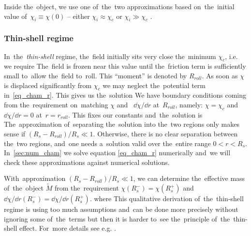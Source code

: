 Inside the~object, we use one of~the~two approximations based on~the~initial value of~$\chi_i\equiv\chi(0)$ -- either $\chi_i\approx\chi_c$ or $\chi_i\gg\chi_c$ .
\subsubsection{Thin-shell regime}
In~the~\textit{thin-shell} regime, the~field initially sits very close the~minimum $\chi_c$, i.e. we require
The~field is frozen near this value until the~friction term is sufficiently small to~allow the~field to~roll. This ``moment'' is denoted by $R_{roll}$. As soon as $\chi$ is displaced significantly from $\chi_c$ we may neglect the~potential term in~\eqref{eq_cham_r}. This gives us the~solution
We have boundary conditions coming from the~requirement on~matching $\chi$ and~ $\dd\chi/\dd r$ at~$R_{roll}$, namely: $\chi=\chi_c$ and~$\dd\chi/\dd r=0$ at~$r=r_{roll}$. This fixes our constants and~the~solution is
The~approximation of~separating the~solution into the~two regions only makes sense if $(R_s-R_{roll})/R_s\ll1$. Otherwise, there is no clear separation between the~two regions, and~one needs a~solution valid over the~entire range $0<r<R_s$. In~\autoref{sec:num_cham} we solve equation \eqref{eq_cham_r} numerically and~we will check these approximations against numerical solutions.

With~approximation $(R_s-R_{roll})/R_s\ll1$, we can determine the~effective mass of~the~object $\tilde{M}$ from the~requirement $\chi(R_s^-)=\chi(R_s^+)$ and~$\dd\chi/\dd r(R_s^-)=\dd\chi/\dd r(R_s^+)$.
where
This qualitative derivation of~the~thin-shell regime is using too much assumptions and~can be done more precisely without ignoring some of~the~terms but then it is harder to~see the~principle of~the~thin-shell effect. For~more details see e.g. \textcite{Tamaki:2008mf,2007PhRvD..75f3501M,Waterhouse:2006wv}.
